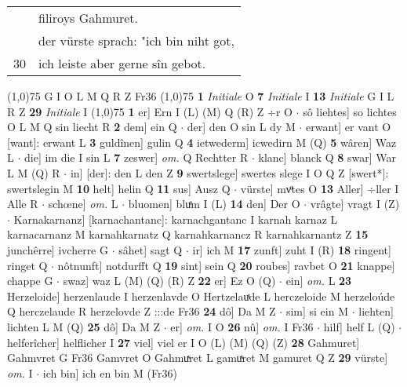 \documentclass[8pt,a4paper,notitlepage]{article}
\begin{document}
\begin{table}[ht]
\begin{minipage}[t]{0.5\linewidth}
\begin{tabular}{rl}
 & filiroys Gahmuret.\\ 
 & der vürste sprach: "ich bin niht got,\\ 
30 & ich leiste aber gerne sîn gebot.\\ 
\end{tabular}
\scriptsize
\line(1,0){75} \newline
G I O L M Q R Z Fr36 \newline
\line(1,0){75} \newline
\textbf{1} \textit{Initiale} O  \textbf{7} \textit{Initiale} I  \textbf{13} \textit{Initiale} G I L R Z  \textbf{29} \textit{Initiale} I  \newline
\line(1,0){75} \newline
\textbf{1} er] Ern I (L) (M) Q (R) Z ÷r O  $\cdot$ sô liehtes] so lichtes O L M Q sin liecht R \textbf{2} dem] ein Q  $\cdot$ der] den O sin L dy M  $\cdot$ erwant] er vant O [want]: erwant L \textbf{3} guldînen] gulin Q \textbf{4} ietwederm] icwedirn M (Q) \textbf{5} wâren] Waz L  $\cdot$ die] im die I sin L \textbf{7} zeswer] \textit{om.} Q Rechtter R  $\cdot$ klanc] blanck Q \textbf{8} swar] War L M (Q) R  $\cdot$ in] [der]: den L den Z \textbf{9} swertslege] swertes slege I O Q Z [swert*]: swertslegin M \textbf{10} helt] helin Q \textbf{11} sus] Ausz Q  $\cdot$ vürste] mvͦtes O \textbf{13} Aller] ÷ller I Alle R  $\cdot$ schœne] \textit{om.} L  $\cdot$ bluomen] bluͤm I (L) \textbf{14} den] Der O  $\cdot$ vrâgte] vragt I (Z)  $\cdot$ Karnakarnanz] [karnachantanc]: karnachgantanc I karnah karnaz L karnacarnanz M karnahkarnatz Q karnahkarnancz R karnahkarnantz Z \textbf{15} junchêrre] ivcherre G  $\cdot$ sâhet] sagt Q  $\cdot$ ir] ich M \textbf{17} zunft] zuht I (R) \textbf{18} ringent] ringet Q  $\cdot$ nôtnunft] notdurfft Q \textbf{19} sint] sein Q \textbf{20} roubes] ravbet O \textbf{21} knappe] chappe G  $\cdot$ swaz] waz L (M) (Q) (R) Z \textbf{22} er] Ez O (Q)  $\cdot$ ein] \textit{om.} L \textbf{23} Herzeloide] herzenlaude I herzenlavde O Hertzelauͯde L herczeloide M herzeloúde Q herczelaude R herzelovde Z :::de Fr36 \textbf{24} dô] Da M Z  $\cdot$ sim] si ein M  $\cdot$ liehten] lichten L M (Q) \textbf{25} dô] Da M Z  $\cdot$ er] \textit{om.} I O \textbf{26} nû] \textit{om.} I Fr36  $\cdot$ hilf] helf L (Q)  $\cdot$ helferîcher] helflicher I \textbf{27} viel] viel er I O (L) (M) (Q) (Z) \textbf{28} Gahmuret] Gahmvret G Fr36 Gamvret O Gahmuͯret L gamuͯret M gamuret Q Z \textbf{29} vürste] \textit{om.} I  $\cdot$ ich bin] ich en bin M (Fr36) \newline
\end{minipage}

\end{table}
\end{document}
